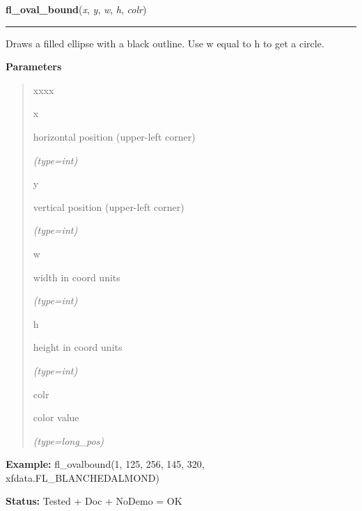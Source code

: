     \label{xformslib:flxbasic:fl_ovalbound}

    \vspace{0.5ex}

\hspace{.8\funcindent}\begin{boxedminipage}{\funcwidth}

    \raggedright \textbf{fl\_oval\_bound}(\textit{x}, \textit{y}, \textit{w}, \textit{h}, \textit{colr})

    \vspace{-1.5ex}

    \rule{\textwidth}{0.5\fboxrule}
\setlength{\parskip}{2ex}
    Draws a filled ellipse with a black outline. Use w equal to h to get a 
    circle.

\setlength{\parskip}{1ex}
      \textbf{Parameters}
      \vspace{-1ex}

      \begin{quote}
        \begin{Ventry}{xxxx}

          \item[x]

          horizontal position (upper-left corner)

            {\it (type=int)}

          \item[y]

          vertical position (upper-left corner)

            {\it (type=int)}

          \item[w]

          width in coord units

            {\it (type=int)}

          \item[h]

          height in coord units

            {\it (type=int)}

          \item[colr]

          color value

            {\it (type=long\_pos)}

        \end{Ventry}

      \end{quote}

\textbf{Example:} fl\_ovalbound(1, 125, 256, 145, 320, xfdata.FL\_BLANCHEDALMOND)



\textbf{Status:} Tested + Doc + NoDemo = OK



    \end{boxedminipage}

